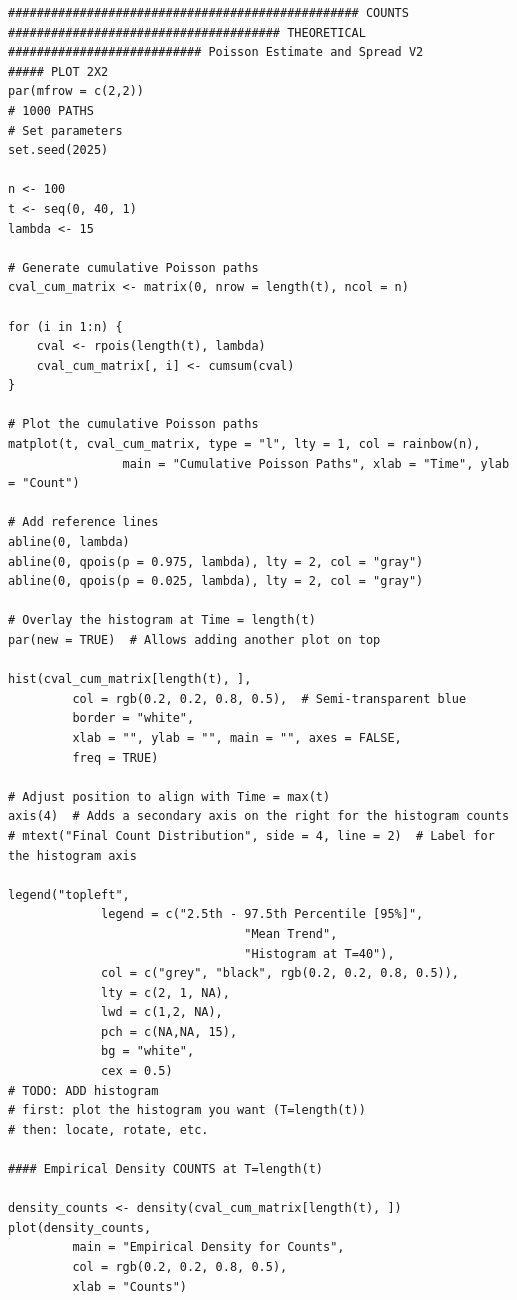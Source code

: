 \begin{knitrout}
\color{fgcolor}\begin{kframe}
\begin{verbatim}
################################################# COUNTS
###################################### THEORETICAL
########################### Poisson Estimate and Spread V2
##### PLOT 2X2 
par(mfrow = c(2,2))
# 1000 PATHS
# Set parameters
set.seed(2025)

n <- 100
t <- seq(0, 40, 1)
lambda <- 15

# Generate cumulative Poisson paths
cval_cum_matrix <- matrix(0, nrow = length(t), ncol = n)

for (i in 1:n) {
	cval <- rpois(length(t), lambda)  
	cval_cum_matrix[, i] <- cumsum(cval)  
}

# Plot the cumulative Poisson paths
matplot(t, cval_cum_matrix, type = "l", lty = 1, col = rainbow(n),
				main = "Cumulative Poisson Paths", xlab = "Time", ylab = "Count")

# Add reference lines
abline(0, lambda)
abline(0, qpois(p = 0.975, lambda), lty = 2, col = "gray")
abline(0, qpois(p = 0.025, lambda), lty = 2, col = "gray")

# Overlay the histogram at Time = length(t)
par(new = TRUE)  # Allows adding another plot on top

hist(cval_cum_matrix[length(t), ], 
		 col = rgb(0.2, 0.2, 0.8, 0.5),  # Semi-transparent blue
		 border = "white",
		 xlab = "", ylab = "", main = "", axes = FALSE, 
		 freq = TRUE)

# Adjust position to align with Time = max(t)
axis(4)  # Adds a secondary axis on the right for the histogram counts
# mtext("Final Count Distribution", side = 4, line = 2)  # Label for the histogram axis

legend("topleft",
			 legend = c("2.5th - 97.5th Percentile [95%]",
			 					 "Mean Trend",
			 					 "Histogram at T=40"),
			 col = c("grey", "black", rgb(0.2, 0.2, 0.8, 0.5)),
			 lty = c(2, 1, NA),
			 lwd = c(1,2, NA),
			 pch = c(NA,NA, 15),
			 bg = "white",
			 cex = 0.5) 
# TODO: ADD histogram
# first: plot the histogram you want (T=length(t))
# then: locate, rotate, etc.

#### Empirical Density COUNTS at T=length(t)

density_counts <- density(cval_cum_matrix[length(t), ])
plot(density_counts,
		 main = "Empirical Density for Counts",
		 col = rgb(0.2, 0.2, 0.8, 0.5),
		 xlab = "Counts")



\end{verbatim}
\end{kframe}
\end{knitrout}
